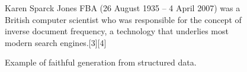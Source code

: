\begin{figure}

Karen Sp\:arck Jones FBA (26 August 1935 – 4 April 2007) was a British computer scientist who was responsible for the concept of inverse document frequency, a technology that underlies most modern search engines.[3][4]

\caption{Example of faithful generation from structured data.}
\label{fig:fgen_example1}
\end{figure}

